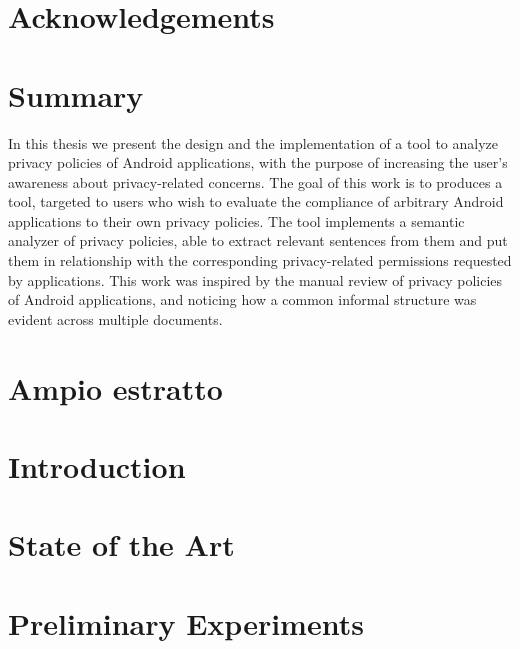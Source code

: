 \documentclass[a4paper,12pt,twoside,final]{book}
\theoremstyle{definition}
\begin{document}
	\chapter*{}
		

	\chapter*{Acknowledgements}
		

	
	\chapter*{Summary}
	\label{summary}
	In this thesis we present the design and the implementation of a tool to analyze privacy policies of Android applications, with the purpose of increasing the user's awareness about privacy-related concerns.
	The goal of this work is to produces a tool, targeted to users who wish to evaluate the compliance of arbitrary Android applications to their own privacy policies.
	The tool implements a semantic analyzer of privacy policies, able to extract relevant sentences from them and put them in relationship with the corresponding privacy-related permissions requested by applications.
	This work was inspired by the manual review of privacy policies of Android applications, and noticing how a common informal structure was evident across multiple documents.

	\chapter*{Ampio estratto}
	\label{chap:estratto}
	

	\tableofcontents
	\listoftables
	\listoffigures

	\chapter{Introduction}
		\label{chap:intro}
		
	\chapter{State of the Art}
		\label{chap:SOA}
		
	\chapter{Preliminary Experiments}
		\label{chap:manual-analysis}
		
\end{document}
